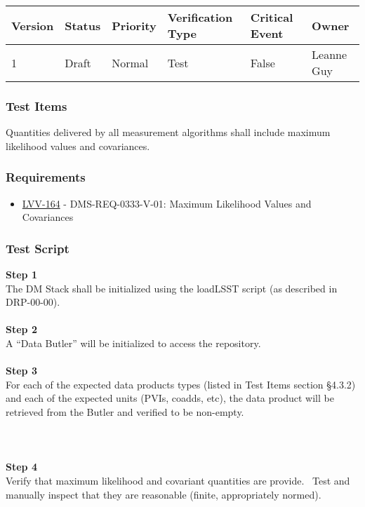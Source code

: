 \begin{longtable}[]{@{}llllll@{}}
\toprule
Version & Status & Priority & Verification Type & Critical Event &
Owner\tabularnewline
\midrule
\endhead
1 & Draft & Normal & Test & False & Leanne Guy\tabularnewline
\bottomrule
\end{longtable}

\hypertarget{test-items-3}{%
\subsubsection{Test Items}\label{test-items-3}}

Quantities delivered by all measurement algorithms shall include maximum
likelihood values and covariances.

\hypertarget{requirements-3}{%
\subsubsection{Requirements}\label{requirements-3}}

\begin{itemize}
\tightlist
\item
  \href{https://jira.lsstcorp.org/browse/LVV-164}{LVV-164} -
  DMS-REQ-0333-V-01: Maximum Likelihood Values and Covariances
\end{itemize}

\hypertarget{test-script-3}{%
\subsubsection{Test Script}\label{test-script-3}}

\textbf{Step 1}\\
The DM Stack shall be initialized using the loadLSST script (as
described in DRP-00-00).\\
~\\
\textbf{Step 2}\\
A ``Data Butler'' will be initialized to access the repository.\\
~\\
\textbf{Step 3}\\
For each of the expected data products types (listed in Test Items
section §4.3.2) and each of the expected units (PVIs, coadds, etc), the
data product will be retrieved from the Butler and verified to be
non-empty.\\
~\\
~\\
~\\
\textbf{Step 4}\\
Verify that maximum likelihood and covariant quantities are provide.
~Test and manually inspect that they are reasonable (finite,
appropriately normed).\\
~\\

